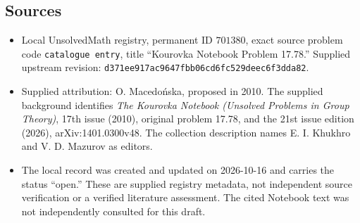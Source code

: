 \documentclass[11pt]{article}
\begin{document}
\subsection{Sources}
\begin{itemize}
\item Local UnsolvedMath registry, permanent ID \(701380\), exact source problem code \texttt{catalogue entry}, title ``Kourovka Notebook Problem 17.78.'' Supplied upstream revision: \texttt{d371ee917ac9647fbb06cd6fc529deec6f3dda82}.
\item Supplied attribution: O. Macedo\'nska, proposed in 2010. The supplied background identifies \emph{The Kourovka Notebook (Unsolved Problems in Group Theory)}, 17th issue (2010), original problem 17.78, and the 21st issue edition (2026), arXiv:1401.0300v48. The collection description names E. I. Khukhro and V. D. Mazurov as editors.
\item The local record was created and updated on 2026-10-16 and carries the status ``open.'' These are supplied registry metadata, not independent source verification or a verified literature assessment. The cited Notebook text was not independently consulted for this draft.
\end{itemize}
\end{document}

